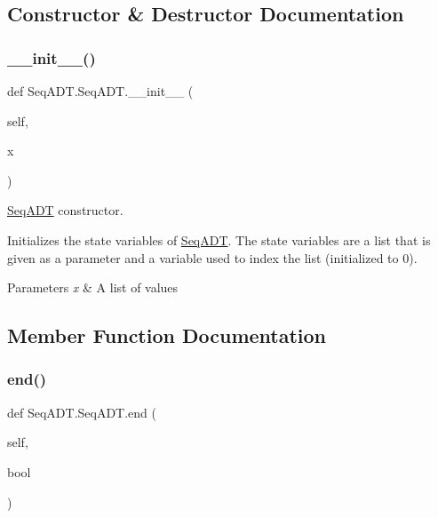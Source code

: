 \subsection{Constructor \& Destructor Documentation}
\mbox{\label{class_seq_a_d_t_1_1_seq_a_d_t_a0a2cd3b0428cb4bf15c2f7ea2bd454cf}} 
\subsubsection{\texorpdfstring{\+\_\+\+\_\+init\+\_\+\+\_\+()}{\_\_init\_\_()}}
{\footnotesize\ttfamily def Seq\+A\+D\+T.\+Seq\+A\+D\+T.\+\_\+\+\_\+init\+\_\+\+\_\+ (\begin{DoxyParamCaption}\item[{}]{self,  }\item[{}]{x }\end{DoxyParamCaption})}



\hyperlink{class_seq_a_d_t_1_1_seq_a_d_t}{Seq\+A\+DT} constructor. 

Initializes the state variables of \hyperlink{class_seq_a_d_t_1_1_seq_a_d_t}{Seq\+A\+DT}. The state variables are a list that is given as a parameter and a variable used to index the list (initialized to 0). 
\begin{DoxyParams}{Parameters}
{\em x} & A list of values \\
\hline
\end{DoxyParams}


\subsection{Member Function Documentation}
\mbox{\label{class_seq_a_d_t_1_1_seq_a_d_t_a7d8df17dae5df548ca32054075ca04b8}} 
\subsubsection{\texorpdfstring{end()}{end()}}
{\footnotesize\ttfamily def Seq\+A\+D\+T.\+Seq\+A\+D\+T.\+end (\begin{DoxyParamCaption}\item[{}]{self,  }\item[{}]{bool }\end{DoxyParamCaption})}



